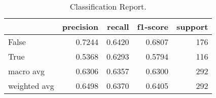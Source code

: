 \begin{table}
\centering
\caption{Classification Report.}
\label{tab:classification-report}
\begin{tabular}{lrrrr}
\toprule
{} &  precision &  recall &  f1-score &  support \\
\midrule
False        &     0.7244 &  0.6420 &    0.6807 &      176 \\
True         &     0.5368 &  0.6293 &    0.5794 &      116 \\
macro avg    &     0.6306 &  0.6357 &    0.6300 &      292 \\
weighted avg &     0.6498 &  0.6370 &    0.6405 &      292 \\
\bottomrule
\end{tabular}
\end{table}
